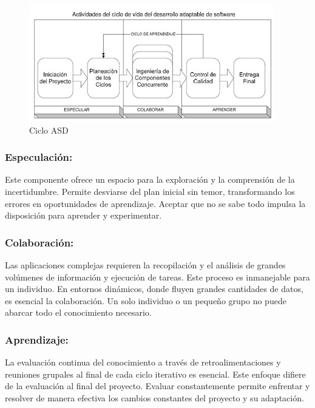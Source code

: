 \documentclass[
  12pt,
  openany]{book}
\begin{document}
\begin{figure}

{\centering \includegraphics[width=0.6\linewidth]{images/04-metodologia/02_ciclo} 

}

\caption{Ciclo ASD}\label{fig:metdas}
\end{figure}

\hypertarget{especulaciuxf3n}{%
\subsubsection{\texorpdfstring{\textbf{Especulación:}}{Especulación:}}\label{especulaciuxf3n}}

Este componente ofrece un espacio para la exploración y la comprensión de la incertidumbre. Permite desviarse del plan inicial sin temor, transformando los errores en oportunidades de aprendizaje. Aceptar que no se sabe todo impulsa la disposición para aprender y experimentar.

\hypertarget{colaboraciuxf3n}{%
\subsubsection{\texorpdfstring{\textbf{Colaboración:}}{Colaboración:}}\label{colaboraciuxf3n}}

Las aplicaciones complejas requieren la recopilación y el análisis de grandes volúmenes de información y ejecución de tareas. Este proceso es inmanejable para un individuo. En entornos dinámicos, donde fluyen grandes cantidades de datos, es esencial la colaboración. Un solo individuo o un pequeño grupo no puede abarcar todo el conocimiento necesario.

\hypertarget{aprendizaje}{%
\subsubsection{\texorpdfstring{\textbf{Aprendizaje:}}{Aprendizaje:}}\label{aprendizaje}}

La evaluación continua del conocimiento a través de retroalimentaciones y reuniones grupales al final de cada ciclo iterativo es esencial. Este enfoque difiere de la evaluación al final del proyecto. Evaluar constantemente permite enfrentar y resolver de manera efectiva los cambios constantes del proyecto y su adaptación.
\end{document}
